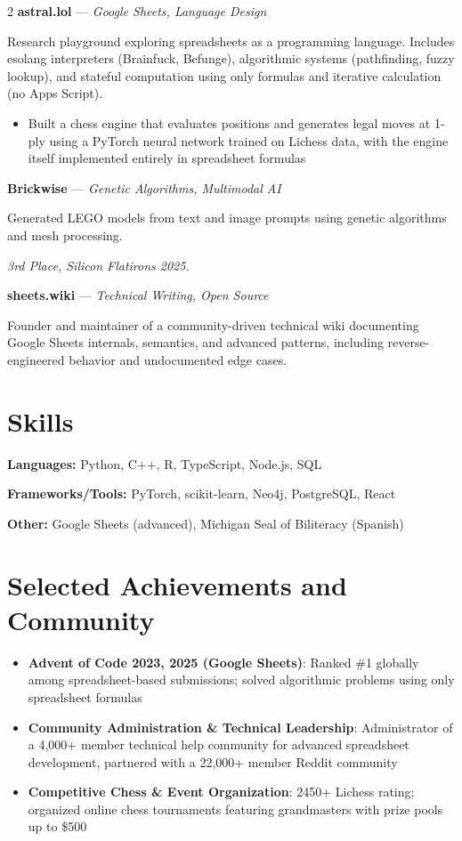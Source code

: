 \documentclass[11pt,letterpaper]{article}
\begin{document}
\begin{multicols}{2}
\textbf{astral.lol} — \textit{Google Sheets, Language Design}

Research playground exploring spreadsheets as a programming language. Includes esolang interpreters (Brainfuck, Befunge), algorithmic systems (pathfinding, fuzzy lookup), and stateful computation using only formulas and iterative calculation (no Apps Script).

\begin{itemize}
  \item Built a chess engine that evaluates positions and generates legal moves at 1-ply using a PyTorch neural network trained on Lichess data, with the engine itself implemented entirely in spreadsheet formulas
\end{itemize}
\textbf{Brickwise} — \textit{Genetic Algorithms, Multimodal AI}

Generated LEGO models from text and image prompts using genetic algorithms and mesh processing.

\textit{3rd Place, Silicon Flatirons 2025.}

\textbf{sheets.wiki} — \textit{Technical Writing, Open Source}

Founder and maintainer of a community-driven technical wiki documenting Google Sheets internals, semantics, and advanced patterns, including reverse-engineered behavior and undocumented edge cases.


\section*{Skills}
\textbf{Languages:} Python, C++, R, TypeScript, Node.js, SQL

\textbf{Frameworks/Tools:} PyTorch, scikit-learn, Neo4j, PostgreSQL, React

\textbf{Other:} Google Sheets (advanced), Michigan Seal of Biliteracy (Spanish)


\section*{Selected Achievements and Community}
\begin{itemize}
  \item \textbf{Advent of Code 2023, 2025 (Google Sheets)}: Ranked \#1 globally among spreadsheet-based submissions; solved algorithmic problems using only spreadsheet formulas
  \item \textbf{Community Administration \& Technical Leadership}: Administrator of a 4,000+ member technical help community for advanced spreadsheet development, partnered with a 22,000+ member Reddit community
  \item \textbf{Competitive Chess \& Event Organization}: 2450+ Lichess rating; organized online chess tournaments featuring grandmasters with prize pools up to \$500
\end{itemize}

\end{multicols}
\end{document}
